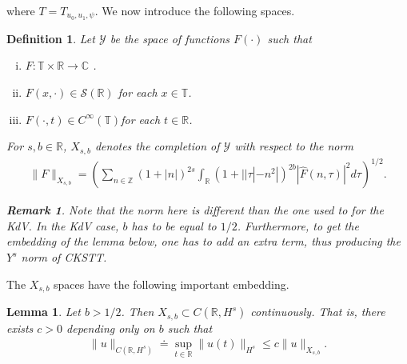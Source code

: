 \documentclass[12pt,reqno]{amsart}
\numberwithin{equation}{section}  %
\newcommand{\rr}{\mathbb{R}}
\newcommand{\zz}{\mathbb{Z}}
\newcommand{\cc}{\mathbb{C}}
\newcommand{\ci}{\mathbb{T}}
\newcommand{\wh}{\widehat}
\newtheorem{lemma}[theorem]{Lemma}
\newtheorem{definition}[theorem]{Definition}
\newtheorem{remark}[theorem]{Remark}
\begin{document}
%
%
where $T=T_{u_0, u_1, \psi}$.  We now introduce the following spaces. 
%
%
\begin{definition}
  Let $\mathcal{Y}$ be the space of functions $F(\cdot)$ such that
  \begin{enumerate}[(i)]
   \item{$F: \ci \times \rr \to \cc$ }.
   \item{ $F(x, \cdot) \in \mathcal{S}(\rr)$ for each $x \in \ci$}.
   \item{ $F(\cdot, t) \in C^{\infty}(\ci)$for each $t \in \rr$}.
  \end{enumerate}
  For $s, b \in \rr$, $X_{s,b}$ denotes the completion of $\mathcal{Y}$ with
  respect to the norm
  \begin{equation}
  \begin{split}
    \|F\|_{X_{s,b}} = \left( \sum_{n \in \zz} (1 + |n|)^{2s} \int_{\rr}
    (1 + | | \tau | - n^{2} |)^{2b} |\wh{F}(n, \tau)|^{2} d \tau\right)^{1/2}.
  \end{split}
  \label{eqn:bous-norm}
  \end{equation}
  \begin{framed}
    \begin{remark}
    Note that the norm here is different than the one used to for the KdV. In
    the KdV case, $b$ has to be equal to $1/2$. Furthermore, to get the embedding
    of the lemma below, one has to add an extra term, thus producing the
    $Y^{s}$ norm of CKSTT.
    \label{rem:alternate-space}
    \end{remark}
  \end{framed}
\end{definition}
%
The $X_{s,b}$ spaces have the following important embedding.
%
%
%
%
%
%
%
\begin{lemma}
  Let $b > 1/2$. Then $X_{s, b} \subset C(\rr, H^s)$ continuously. That is,
  there exists $c>0$ depending only on $b$ such that
%
%
\begin{equation*}
\begin{split}
  \| u \|_{C(\rr, H^s) } \doteq \sup_{t \in \rr} \| u(t) \|_{H^s } 
  \le c \| u \|_{X_{s,b}}.
\end{split}
\end{equation*}
%
\label{lem:embedding}
\end{lemma}
%
%
%
%
\end{document}
